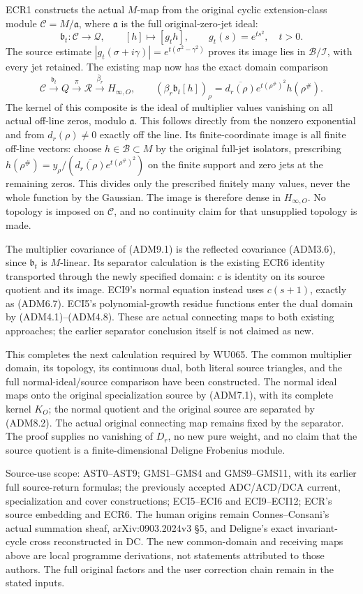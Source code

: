ECR1 constructs the actual \(M\)-map from the original cyclic
extension-class module \(\mathscr C=M/\mathfrak a\), where
\(\mathfrak a\) is the full original-zero-jet ideal: \[
\mathfrak b_t:\mathscr C\to\mathcal Q,\qquad
[h]\mapsto[g_t h],\qquad g_t(s)=e^{ts^2},\quad t>0.
\] The source estimate
\(|g_t(\sigma+i\gamma)|=e^{t(\sigma^2-\gamma^2)}\) proves its image lies
in \(\mathcal B/\mathcal I\), with every jet retained. The existing map
now has the exact domain comparison \[
\mathscr C\xrightarrow{\mathfrak b_t}Q
\xrightarrow{\pi}\mathcal R
\xrightarrow{\overline\beta_r}H_{\infty,O},\qquad
(\beta_r\mathfrak b_t[h])_\rho
=\overline{d_r(\rho)}e^{t(\rho^\#)^2}h(\rho^\#).
\tag{ADM9.1}
\] The kernel of this composite is the ideal of multiplier values
vanishing on all actual off-line zeros, modulo \(\mathfrak a\). This
follows directly from the nonzero exponential and from \(d_r(\rho)\ne0\)
exactly off the line. Its finite-coordinate image is all finite off-line
vectors: choose \(h\in\mathcal B\subset M\) by the original full-jet
isolators, prescribing
\(h(\rho^\#)=y_\rho/(\overline{d_r(\rho)}e^{t(\rho^\#)^2})\) on the
finite support and zero jets at the remaining zeros. This divides only
the prescribed finitely many values, never the whole function by the
Gaussian. The image is therefore dense in \(H_{\infty,O}\). No topology
is imposed on \(\mathscr C\), and no continuity claim for that
unsupplied topology is made.

The multiplier covariance of (ADM9.1) is the reflected covariance
(ADM3.6), since \(\mathfrak b_t\) is \(M\)-linear. Its separator
calculation is the existing ECR6 identity transported through the newly
specified domain: \(c\) is identity on its source quotient and its
image. ECI9's normal equation instead uses \(c(s+1)\), exactly as
(ADM6.7). ECI5's polynomial-growth residue functions enter the dual
domain by (ADM4.1)--(ADM4.8). These are actual connecting maps to both
existing approaches; the earlier separator conclusion itself is not
claimed as new.

This completes the next calculation required by WU065. The common
multiplier domain, its topology, its continuous dual, both literal
source triangles, and the full normal-ideal/source comparison have been
constructed. The normal ideal maps onto the original specialization
source by (ADM7.1), with its complete kernel \(K_O\); the normal
quotient and the original source are separated by (ADM8.2). The actual
original connecting map remains fixed by the separator. The proof
supplies no vanishing of \(D_r\), no new pure weight, and no claim that
the source quotient is a finite-dimensional Deligne Frobenius module.

Source-use scope: AST0--AST9; GMS1--GMS4 and GMS9--GMS11, with its
earlier full source-return formulas; the previously accepted ADC/ACD/DCA
current, specialization and cover constructions; ECI5--ECI6 and
ECI9--ECI12; ECR's source embedding and ECR6. The human origins remain
Connes--Consani's actual summation sheaf, arXiv:0903.2024v3 §5, and
Deligne's exact invariant-cycle cross reconstructed in DC. The new
common-domain and receiving maps above are local programme derivations,
not statements attributed to those authors. The full original factors
and the user correction chain remain in the stated inputs.
